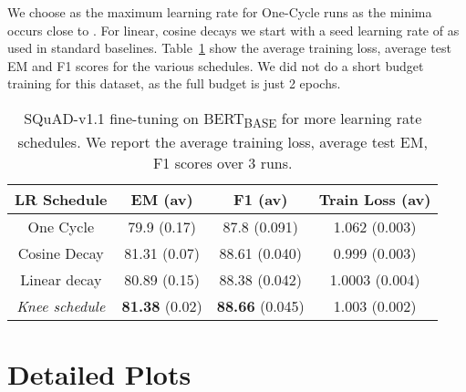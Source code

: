 \documentclass[twoside,11pt]{article}
\newcommand{\lrschedule}{\textit{Knee schedule}}
\begin{document}
We choose  as the maximum learning rate for One-Cycle runs as the minima occurs close to  . For linear, cosine decays we start with a seed learning rate of  as used in standard baselines.  Table~\ref{tab:squad_results_extra_baselines} show the average training loss, average test EM and F1 scores for the various schedules. We did not do a short budget training for this dataset, as the full budget is just 2 epochs.

\begin{table}[h!]
\small
\centering
\caption{SQuAD-v1.1 fine-tuning on BERT\textsubscript{BASE} for more learning rate schedules. We report the average training loss, average test EM, F1 scores over 3 runs.}
\label{tab:squad_results_extra_baselines}
\begin{tabular}{cccc}
  \toprule
  LR Schedule    & EM (av)  & F1 (av) & Train Loss (av)  \\ 
  \midrule
  One Cycle        & 79.9 (0.17) & 87.8 (0.091) & 1.062 (0.003) \\
  Cosine Decay      & 81.31 (0.07) & 88.61 (0.040) & 0.999 (0.003) \\
  Linear decay      & 80.89 (0.15) & 88.38 (0.042) & 1.0003 (0.004)\\
  \lrschedule{}     & \textbf{81.38} (0.02)  & \textbf{88.66} (0.045) & 1.003 (0.002)\\
  \bottomrule
\end{tabular}
\end{table}









 \clearpage
\section{Detailed Plots}
\label{sec:detailed_plots}
\end{document}
